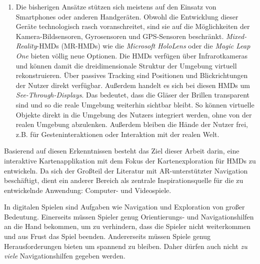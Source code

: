 \begin{enumerate}
\item Die bisherigen Ansätze stützen sich meistens auf den Einsatz von Smartphones oder anderen Handgeräten.
Obwohl die Entwicklung dieser Geräte technologisch rasch voranschreitet, sind sie auf die Möglichkeiten der Kamera-Bildsensoren, Gyrosensoren und GPS-Sensoren beschränkt.
\emph{Mixed-Reality}-HMDs (MR-HMDs) wie die \emph{Microsoft HoloLens} \parencite{Microsoft2018} oder die \emph{Magic Leap One} \parencite{MagicLeap2018} bieten völlig neue Optionen.
Die HMDs verfügen über Infrarotkameras und können damit die dreidimensionale Struktur der Umgebung virtuell rekonstruieren.
Über passives Tracking sind Positionen und Blickrichtungen der Nutzer direkt verfügbar.
Außerdem handelt es sich bei diesen HMDs um \emph{See-Through-Displays}.
Das bedeutet, dass die Gläser der Brillen transparent sind und so die reale Umgebung weiterhin sichtbar bleibt.
So können virtuelle Objekte direkt in die Umgebung des Nutzers integriert werden, ohne von der realen Umgebung abzulenken.
Außerdem bleiben die Hände der Nutzer frei, z.B. für Gesteninteraktionen oder Interaktion mit der realen Welt.
\end{enumerate}

Basierend auf diesen Erkenntnissen besteht das Ziel dieser Arbeit darin, eine interaktive Kartenapplikation mit dem Fokus der Kartenexploration für HMDs zu entwickeln.
Da sich der Großteil der Literatur mit AR-unterstützter Navigation beschäftigt, dient ein anderer Bereich als zentrale Inspirationsquelle für die zu entwickelnde Anwendung: Computer- und Videospiele.

In digitalen Spielen sind Aufgaben wie Navigation und Exploration von großer Bedeutung.
Einerseits müssen Spieler genug Orien\-tie\-rungs- und Navigationshilfen an die Hand bekommen, um zu verhindern, dass die Spieler nicht weiterkommen und aus Frust das Spiel beenden.
Andererseits müssen Spiele genug Herausforderungen bieten um spannend zu bleiben.
Daher dürfen auch nicht \emph{zu viele} Navigationshilfen gegeben werden.


